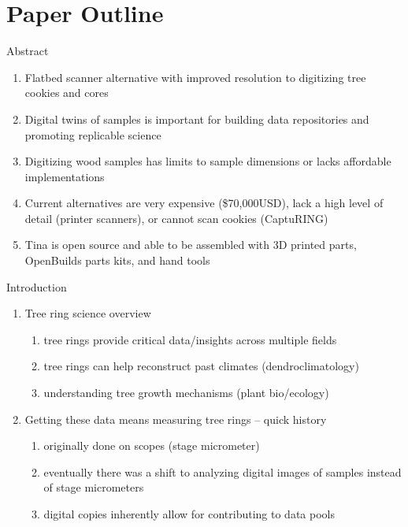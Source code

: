 \documentclass{article}
\begin{document}
\section {Paper Outline}
\begin{outline}[enumerate]

\1 Abstract
\begin{enumerate}
	\item Flatbed scanner alternative with improved resolution to digitizing tree cookies and cores
	\item Digital twins of samples is important for building data repositories and promoting replicable science
	\item Digitizing wood samples has limits to sample dimensions or lacks affordable implementations
	\item Current alternatives are very expensive (\$70,000USD), lack a high level of detail (printer scanners), or cannot scan cookies (CaptuRING)
	\item Tina is open source and able to be assembled with 3D printed parts, OpenBuilds parts kits, and hand tools %
\end{enumerate}
\item Introduction
	\begin{enumerate}
	\item Tree ring science overview
		\begin{enumerate}
		\item tree rings provide critical data/insights across multiple fields %
		\item tree rings can help reconstruct past climates (dendroclimatology) %
		\item understanding tree growth mechanisms (plant bio/ecology) %
		\end{enumerate}
	\item Getting these data means measuring tree rings -- quick history
		\begin{enumerate}
		\item originally done on scopes (stage micrometer) %
		\item eventually there was a shift to analyzing digital images of samples instead of stage micrometers %
		\item digital copies inherently allow for contributing to data pools  %

\end{enumerate}
\end{enumerate}
\end{outline}
\end{document}
